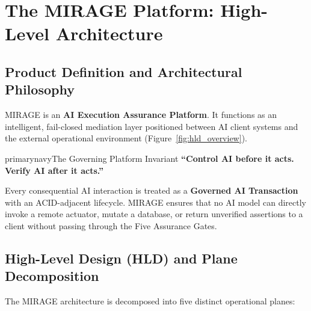 \documentclass[11pt,a4paper]{article}
\begin{document}
\section{The MIRAGE Platform: High-Level Architecture}

\subsection{Product Definition and Architectural Philosophy}
MIRAGE is an \textbf{AI Execution Assurance Platform}. It functions as an intelligent, fail-closed mediation layer positioned between AI client systems and the external operational environment (Figure~\ref{fig:hld_overview}).

\begin{infobox}{primarynavy}{The Governing Platform Invariant}
\centering\large\sffamily\bfseries
``Control AI before it acts. Verify AI after it acts.''
\end{infobox}

Every consequential AI interaction is treated as a \textbf{Governed AI Transaction} with an ACID-adjacent lifecycle. MIRAGE ensures that no AI model can directly invoke a remote actuator, mutate a database, or return unverified assertions to a client without passing through the Five Assurance Gates.

\subsection{High-Level Design (HLD) and Plane Decomposition}
The MIRAGE architecture is decomposed into five distinct operational planes:
\end{document}
